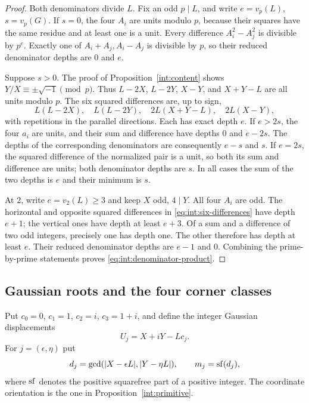 \begin{proof}
Both denominators divide $L$. Fix an odd $p\mid L$, and write
$e=v_p(L)$, $s=v_p(G)$. If $s=0$, the four $A_i$ are units modulo
$p$, because their squares have the same residue and at least one is
a unit. Every difference $A_i^2-A_j^2$ is divisible by $p^e$.
Exactly one of $A_i+A_j,A_i-A_j$ is divisible by $p$, so their
reduced denominator depths are $0$ and $e$.

Suppose $s>0$. The proof of Proposition~\ref{int:content} shows
$Y/X\equiv\pm\sqrt{-1}\pmod p$. Thus
$L-2X$, $L-2Y$, $X-Y$, and $X+Y-L$ are all units modulo $p$.
The six squared differences are, up to sign,
\begin{equation}\label{eq:int:six-differences}
 L(L-2X),\quad L(L-2Y),\quad
 2L(X+Y-L),\quad 2L(X-Y),
\end{equation}
with repetitions in the parallel directions. Each has exact depth
$e$. If $e>2s$, the four $a_i$ are units, and their sum and difference
have depths $0$ and $e-2s$. The depths of the corresponding
denominators are consequently $e-s$ and $s$. If $e=2s$, the squared
difference of the normalized pair is a unit, so both its sum and
difference are units; both denominator depths are $s$. In all cases
the sum of the two depths is $e$ and their minimum is $s$.

At $2$, write $e=v_2(L)\ge3$ and keep $X$ odd, $4\mid Y$. All four
$A_i$ are odd. The horizontal and opposite squared differences in
\eqref{eq:int:six-differences} have depth $e+1$; the vertical ones
have depth at least $e+3$. Of a sum and a difference of two odd
integers, precisely one has depth one. The other therefore has depth
at least $e$. Their reduced denominator depths are $e-1$ and $0$.
Combining the prime-by-prime statements proves
\eqref{eq:int:denominator-product}.
\end{proof}

\subsection{Gaussian roots and the four corner classes}

Put $c_0=0$, $c_1=1$, $c_2=i$, $c_3=1+i$, and define the integer
Gaussian displacements
\[
 U_j=X+iY-Lc_j.
\]
For $j=(\epsilon,\eta)$ put
\[
 d_j=\gcd(|X-\epsilon L|,|Y-\eta L|),\qquad
 m_j=\sf(d_j),
\]
where $\sf$ denotes the positive squarefree part of a positive integer.
The coordinate orientation is the one in Proposition~\ref{int:primitive}.

